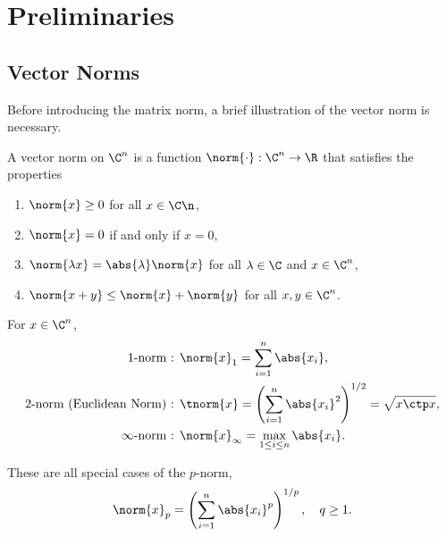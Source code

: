 \documentclass{article}
\numberwithin{equation}{section} %
\newcommand{\gnorm}[1]{\norm{#1}}
\begin{document}
\maketitle
\tableofcontents
\thispagestyle{firstpage}



\section{Preliminaries}\label{sec:norms-svd}

\subsection{Vector Norms} \label{subsec:vector-norms}

Before introducing the matrix norm, a brief illustration of the vector norm
is necessary.

\begin{definition}  \label{def:vector-norm}
A vector norm on
$\C^n$ is a function $\gnorm{\cdot} : \C^n \to \R$ that satisfies the
properties
\begin{enumerate}
\item $\gnorm{x} \geq 0$ for all $x\in\C\n$,
\item $\gnorm{x} = 0$ if and only if $x = 0$,
\item $\gnorm{\lambda x} = \abs{\lambda} \gnorm{x}$ for all
$\lambda \in \C$ and $x \in \C^n$,
\item $\gnorm{x + y} \leq \gnorm{x} + \gnorm{y}$ for all $x,y\in \C^n$.
\end{enumerate}
\end{definition}

\begin{example}
For $x\in\C^n$,
\begin{equation}\notag
  \begin{aligned}
    \text{1-norm : }& \gnorm{x}_1 = \sum_{i = 1}^n \abs{x_i},\\
    \text{2-norm (Euclidean Norm) : }& \tnorm{x} = \left(\sum_{i = 1}^n \abs{x_i}^2\right)^{1/2} = \sqrt{x\ctp x},\\
    \text{$\infty$-norm : } & \gnorm{x}_{\infty} = \max_{1\leq i \leq n} \abs{x_i}.
  \end{aligned}
\end{equation}
    
These are all special cases of the $p$-norm,
\begin{equation}\label{eq:vector-p-norm}
  \gnorm{x}_p = \left(\sum_{i = 1}^n \abs{x_i}^p\right)^{1/p},\quad q \geq 1.
\end{equation}
\end{example}
\end{document}
